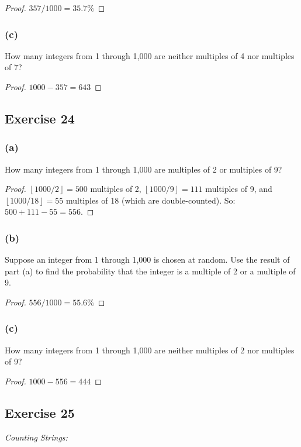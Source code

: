 \documentclass[14pt]{extarticle}
\newcommand{\floor}[1]{{\left\lfloor#1\right\rfloor}}
\begin{document}
\begin{proof}
\(357/1000 = 35.7\%\)
\end{proof}

\subsubsection{(c)}
How many integers from 1 through 1,000 are neither multiples of 4 nor multiples of 7?

\begin{proof}
\(1000-357 = 643\)
\end{proof}

\subsection{Exercise 24}
\subsubsection{(a)}
How many integers from 1 through 1,000 are multiples of 2 or multiples of 9?

\begin{proof}
\(\floor{1000 / 2} = 500\) multiples of 2, \(\floor{1000 / 9} = 111\) multiples of 9, and \(\floor{1000 / 18} = 55\)
multiples of 18 (which are double-counted). So: \(500 + 111 - 55 = 556\).
\end{proof}

\subsubsection{(b)}
Suppose an integer from 1 through 1,000 is chosen at random. Use the result of part (a) to find the probability that the integer is a multiple of 2 or a multiple of 9.

\begin{proof}
\(556/1000=55.6\%\)
\end{proof}

\subsubsection{(c)}
How many integers from 1 through 1,000 are neither multiples of 2 nor multiples of 9?

\begin{proof}
\(1000-556=444\)
\end{proof}

\subsection{Exercise 25}
{\it Counting Strings:}
\end{document}
